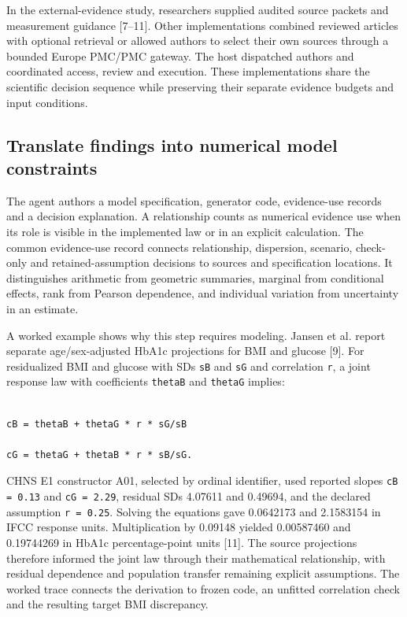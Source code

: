 \documentclass[10pt,twocolumn]{article}
\begin{document}
In the external-evidence study, researchers supplied audited source packets and measurement guidance [7–11]. Other implementations combined reviewed articles with optional retrieval or allowed authors to select their own sources through a bounded Europe PMC/PMC gateway. The host dispatched authors and coordinated access, review and execution. These implementations share the scientific decision sequence while preserving their separate evidence budgets and input conditions.


\subsection{Translate findings into numerical model constraints}

The agent authors a model specification, generator code, evidence-use records and a decision explanation. A relationship counts as numerical evidence use when its role is visible in the implemented law or in an explicit calculation. The common evidence-use record connects relationship, dispersion, scenario, check-only and retained-assumption decisions to sources and specification locations. It distinguishes arithmetic from geometric summaries, marginal from conditional effects, rank from Pearson dependence, and individual variation from uncertainty in an estimate.


A worked example shows why this step requires modeling. Jansen et al. report separate age/sex-adjusted HbA1c projections for BMI and glucose [9]. For residualized BMI and glucose with SDs \texttt{sB} and \texttt{sG} and correlation \texttt{r}, a joint response law with coefficients \texttt{thetaB} and \texttt{thetaG} implies:


\noindent\begin{minipage}{\columnwidth}

\begin{lstlisting}

cB = thetaB + thetaG * r * sG/sB

cG = thetaG + thetaB * r * sB/sG.

\end{lstlisting}

\end{minipage}

CHNS E1 constructor A01, selected by ordinal identifier, used reported slopes \texttt{cB = 0.13} and \texttt{cG = 2.29}, residual SDs 4.07611 and 0.49694, and the declared assumption \texttt{r = 0.25}. Solving the equations gave 0.0642173 and 2.1583154 in IFCC response units. Multiplication by 0.09148 yielded 0.00587460 and 0.19744269 in HbA1c percentage-point units [11]. The source projections therefore informed the joint law through their mathematical relationship, with residual dependence and population transfer remaining explicit assumptions. The worked trace connects the derivation to frozen code, an unfitted correlation check and the resulting target BMI discrepancy.
\end{document}
